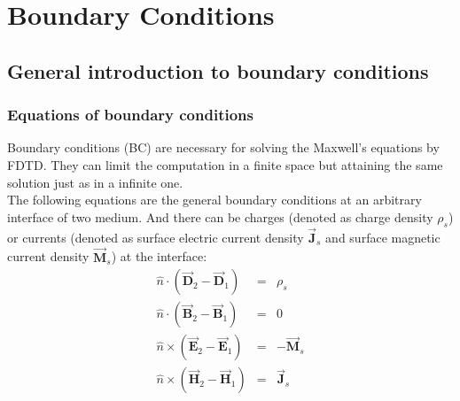 \section{Boundary Conditions}\label{sec:BC}
    \subsection{General introduction to boundary conditions}\label{subsec:General introduction to BC}
    \subsubsection{Equations of boundary conditions}\label{subsubsec:Equations of BC}
	  Boundary conditions (BC) are necessary for solving the  Maxwell's equations by FDTD. They can limit the computation in a finite space but attaining the same solution just as in a infinite one.  \\
	  The following equations are the general boundary conditions at an arbitrary interface of two medium. And there can be  charges (denoted as charge density $\rho_s$) or  currents (denoted as surface electric current density $\vec{\mathbf{J}}_s$ and  surface magnetic current density $\vec{\mathbf{M}}_s$) at the interface:
	      \begin{eqnarray}
		  \hat{n}\cdot(\vec{\mathbf{D}}_2-\vec{\mathbf{D}}_1) &=&\rho_s  \\
		  \hat{n}\cdot(\vec{\mathbf{B}}_2-\vec{\mathbf{B}}_1) &=&0  \\
		  \hat{n}\times(\vec{\mathbf{E}}_2-\vec{\mathbf{E}}_1) &=&-\vec{\mathbf{M}}_s \\
		  \hat{n}\times(\vec{\mathbf{H}}_2-\vec{\mathbf{H}}_1) &=&\vec{\mathbf{J}}_s
		  \label{eq:General boundary conditions}
	      \end{eqnarray}
